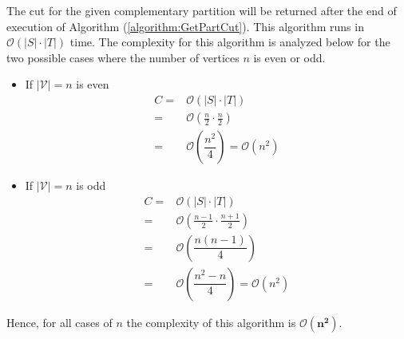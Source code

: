 \documentclass[longpaper, english, final, times]{revdetua}
\begin{document}
				The cut for the given complementary partition will be returned after the end of execution of Algorithm (\ref{algorithm:GetPartCut}). This algorithm runs in $\mathcal{O}(|S|\cdot |T|)$ time. The complexity for this algorithm is analyzed below for the two possible cases where the number of vertices $n$ is even or odd. 
				\begin{itemize}
					\label{list:getpartcut}
					\item If $|\mathcal{V}|=n$ is even
					\begin{align*}
						C = & \mathcal{O}\left(|S|\cdot|T|\right)\\
						= & \mathcal{O}\left(\frac{n}{2}\cdot \frac{n}{2}\right)\\
						= & \mathcal{O}\left(\dfrac{n^2}{4}\right) = \mathcal{O}(n^2)
					\end{align*}
					\item If $|\mathcal{V}|=n$ is odd
					\begin{align*}
						C = & \mathcal{O}\left(|S|\cdot |T|\right)\\
						= & \mathcal{O}\left(\frac{n-1}{2}\cdot \frac{n+1}{2}\right)\\
						= & \mathcal{O}\left(\dfrac{n(n-1)}{4}\right) \\
						= & \mathcal{O}\left(\dfrac{n^2-n}{4}\right)  = \mathcal{O}(n^2)
					\end{align*}
				\end{itemize}
				Hence, for all cases of $n$ the complexity of this algorithm is $\mathbf{\mathcal{O}(n^2)}$.\\
			
\end{document}
